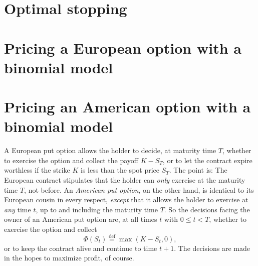 \documentclass[11pt, openany, oneside]{book}
\theoremstyle{definition}
\theoremstyle{remark}
\theoremstyle{boldital}
\numberwithin{equation}{section}
\begin{document}
\section{Optimal stopping}



\section{Pricing a European option with a binomial model}

\section{Pricing an American option with a binomial model}\label{sec:american}

A European put option allows the holder to decide, at maturity time $T$, whether to exercise the option and collect the payoff $K-S_T$, or to let the contract expire worthless if the strike $K$ is less than the spot price $S_T$. The point is: The European contract stipulates that the holder can \textit{only} exercise at the maturity time $T$, not before. An \textit{American put option}, on the other hand, is identical to its European cousin in every respect, \textit{except} that it allows the holder to exercise at \textit{any} time $t$, up to and including the maturity time $T$. So the decisions facing the owner of an American put option are, at all times $t$ with $0 \leq t < T$, whether to exercise the option and collect
	\[
	\Phi(S_t) \stackrel{\text{def}}{=} \max(K-S_t,0),
	\]
or to keep the contract alive and continue to time $t+1$. The decisions are made in the hopes to maximize profit, of course.
\end{document}

